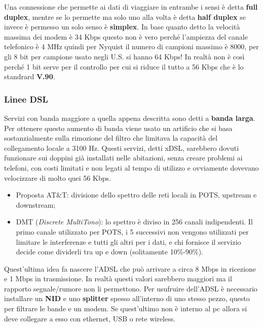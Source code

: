 Una connessione che permette ai dati di viaggiare in entrambe i sensi è detta \textbf{full duplex}, mentre se lo permette ma solo uno alla volta è detta \textbf{half duplex} se invece è permesso un solo senso è \textbf{simplex}. In base quanto detto la velocità massima dei modem è 34 Kbps questo non è vero perché l'ampiezza del canale telefonico è 4 MHz quindi per Nyquist il numero di campioni massimo è 8000, per gli 8 bit per campione usato negli U.S. si hanno 64 Kbps! In realtà non è così perché 1 bit serve per il controllo per cui si riduce il tutto a 56 Kbps che è lo standrard\textbf{ V.90}.

\subsubsection*{Linee DSL}

Servizi con banda maggiore a quella appena descritta sono detti a \textbf{banda larga}. Per ottenere questo aumento di banda viene usato un artificio che si basa sostanzialmente sulla rimozione del filtro che limitava la capacità del collegamento locale a 3100 Hz. Questi servizi, detti xDSL, sarebbero dovuti funzionare sui doppini già installati nelle abitazioni, senza creare problemi ai telefoni, con costi limitati e non legati al tempo di utilizzo e ovviamente dovevano velocizzare di molto quei 56 Kbps. 

\begin{itemize}

\item{Proposta AT\&T: divisione dello spettro delle reti locali in POTS, upstream e downstream};
\item{DMT (\textit{Discrete MultiTono}): lo spettro è diviso in 256 canali indipendenti. Il primo canale utilizzato per POTS, i 5 successivi non vengono utilizzati per limitare le interferenze e tutti gli altri per i dati, e chi fornisce il servizio decide come dividerli tra up e down (solitamente 10\%-90\%)}.

\end{itemize}

Quest'ultima idea fa nascere l'ADSL che può arrivare a circa 8 Mbps in ricezione e 1 Mbps in trasmissione. In realtà questi valori sarebbero maggiori ma il rapporto segnale/rumore non li permettono. Per usufruire dell'ADSL è necessario installare un \textbf{NID} e uno \textbf{splitter} spesso all'interno di uno stesso pezzo, questo per filtrare le bande e un modem. Se quest'ultimo non è interno al pc allora si deve collegare a esso con ethernet, USB o rete wireless.

